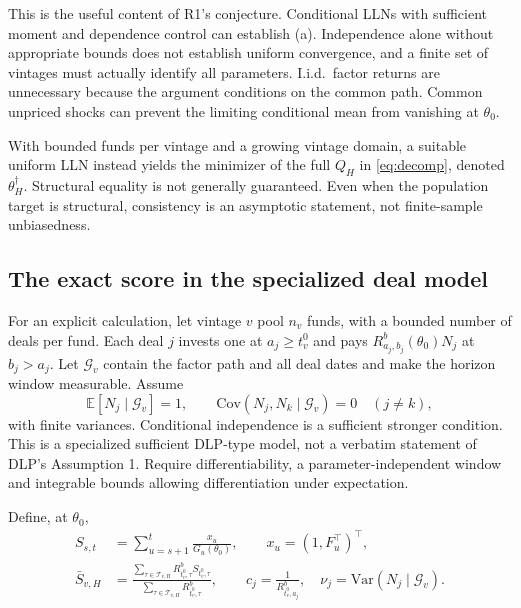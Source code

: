 \documentclass[11pt]{article}
\newcommand{\E}{\mathbb{E}}
\newcommand{\Var}{\mathrm{Var}}
\newcommand{\Cov}{\mathrm{Cov}}
\theoremstyle{plain}
\theoremstyle{definition}
\begin{document}
This is the useful content of R1's conjecture. Conditional LLNs with sufficient moment and dependence control can establish (a). Independence alone without appropriate bounds does not establish uniform convergence, and a finite set of vintages must actually identify all parameters. I.i.d.\ factor returns are unnecessary because the argument conditions on the common path. Common unpriced shocks can prevent the limiting conditional mean from vanishing at $\theta_0$.

With bounded funds per vintage and a growing vintage domain, a suitable uniform LLN instead yields the minimizer of the full $Q_H$ in \eqref{eq:decomp}, denoted $\theta_H^\dagger$. Structural equality is not generally guaranteed. Even when the population target is structural, consistency is an asymptotic statement, not finite-sample unbiasedness.

\subsection{The exact score in the specialized deal model}

For an explicit calculation, let vintage $v$ pool $n_v$ funds, with a bounded number of deals per fund. Each deal $j$ invests one at $a_j\ge t_v^0$ and pays $R^b_{a_j,b_j}(\theta_0)N_j$ at $b_j>a_j$. Let $\mathcal G_v$ contain the factor path and all deal dates and make the horizon window measurable. Assume
\[
\E[N_j\mid\mathcal G_v]=1,\qquad
\Cov(N_j,N_k\mid\mathcal G_v)=0\quad(j\ne k),
\]
with finite variances. Conditional independence is a sufficient stronger condition. This is a specialized sufficient DLP-type model, not a verbatim statement of DLP's Assumption 1. Require differentiability, a parameter-independent window and integrable bounds allowing differentiation under expectation.

Define, at $\theta_0$,
\begin{align*}
S_{s,t}&=\sum_{u=s+1}^t\frac{x_u}{G_u(\theta_0)},\qquad x_u=(1,F_u^\top)^\top,\\
\bar S_{v,H}&=\frac{\sum_{\tau\in\mathcal T_{v,H}}R^b_{t_v^0,\tau}S_{t_v^0,\tau}}{\sum_{\tau\in\mathcal T_{v,H}}R^b_{t_v^0,\tau}},\qquad
c_j=\frac1{R^b_{t_v^0,a_j}},\quad \nu_j=\Var(N_j\mid\mathcal G_v).
\end{align*}
\end{document}

